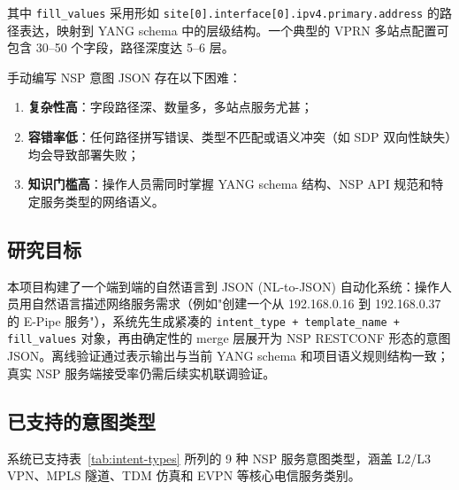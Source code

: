 \documentclass[12pt, a4paper]{article}
\newcommand{\yang}{\textsc{YANG}}
\newcommand{\nsp}{\textsc{NSP}}
\newcommand{\fillvalues}{\texttt{fill\_values}}
\begin{document}
\noindent
其中 \fillvalues{} 采用形如 \texttt{site[0].interface[0].ipv4.primary.address} 的路径表达，映射到 \yang{} schema 中的层级结构。一个典型的 VPRN 多站点配置可包含 30--50 个字段，路径深度达 5--6 层。

手动编写 \nsp{} 意图 JSON 存在以下困难：

\begin{enumerate}
  \item \textbf{复杂性高}：字段路径深、数量多，多站点服务尤甚；
  \item \textbf{容错率低}：任何路径拼写错误、类型不匹配或语义冲突（如 SDP 双向性缺失）均会导致部署失败；
  \item \textbf{知识门槛高}：操作人员需同时掌握 \yang{} schema 结构、\nsp{} API 规范和特定服务类型的网络语义。
\end{enumerate}

\subsection{研究目标}

本项目构建了一个端到端的自然语言到 JSON (NL-to-JSON) 自动化系统：操作人员用自然语言描述网络服务需求（例如"创建一个从 192.168.0.16 到 192.168.0.37 的 E-Pipe 服务"），系统先生成紧凑的 \texttt{intent\_type + template\_name + fill\_values} 对象，再由确定性的 merge 层展开为 NSP RESTCONF 形态的意图 JSON。离线验证通过表示输出与当前 \yang{} schema 和项目语义规则结构一致；真实 NSP 服务端接受率仍需后续实机联调验证。

\subsection{已支持的意图类型}

系统已支持表~\ref{tab:intent-types} 所列的 9 种 \nsp{} 服务意图类型，涵盖 L2/L3 VPN、MPLS 隧道、TDM 仿真和 EVPN 等核心电信服务类别。
\end{document}
